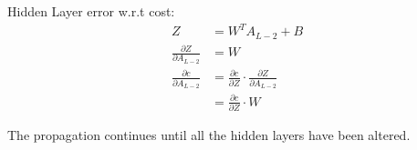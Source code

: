 Hidden Layer error w.r.t cost:
\begin{equation}
    \begin{aligned}
        Z &= W^{T}A_{L-2} + B\\
        \frac{\partial Z}{\partial A_{L-2}} &= W\\[2em]
        \frac{\partial c}{\partial A_{L-2}} &= \frac{\partial c}{\partial Z} \cdot \frac{\partial Z}{\partial A_{L-2}}\\
                                      &= \frac{\partial c}{\partial Z} \cdot W
    \end{aligned}
\end{equation}

The propagation continues until all the hidden layers have been altered.










